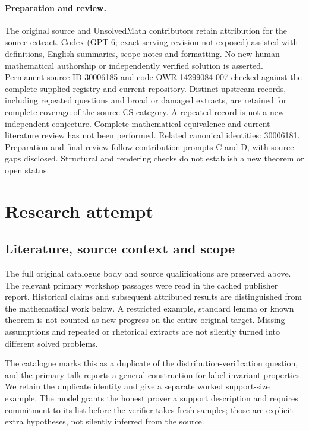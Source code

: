 \documentclass[11pt]{article}
\begin{document}
\paragraph{Preparation and review.}
The original source and UnsolvedMath contributors retain attribution for the source extract. Codex (GPT-6; exact serving revision not exposed) assisted with definitions, English summaries, scope notes and formatting. No new human mathematical authorship or independently verified solution is asserted. Permanent source ID 30006185 and code OWR-14299084-007 checked against the complete supplied registry and current repository. Distinct upstream records, including repeated questions and broad or damaged extracts, are retained for complete coverage of the source CS category. A repeated record is not a new independent conjecture. Complete mathematical-equivalence and current-literature review has not been performed. Related canonical identities: 30006181. Preparation and final review follow contribution prompts C and D, with source gaps disclosed. Structural and rendering checks do not establish a new theorem or open status.
\label{end:30006185}

\section{Research attempt}
\subsection{Literature, source context and scope}
The full original catalogue body and source qualifications are preserved above. The relevant primary workshop passages were read in the cached publisher report. Historical claims and subsequent attributed results are distinguished from the mathematical work below. A restricted example, standard lemma or known theorem is not counted as new progress on the entire original target. Missing assumptions and repeated or rhetorical extracts are not silently turned into different solved problems.

The catalogue marks this as a duplicate of the distribution-verification question, and the primary talk reports a general construction for label-invariant properties. We retain the duplicate identity and give a separate worked support-size example. The model grants the honest prover a support description and requires commitment to its list before the verifier takes fresh samples; those are explicit extra hypotheses, not silently inferred from the source.
\end{document}

